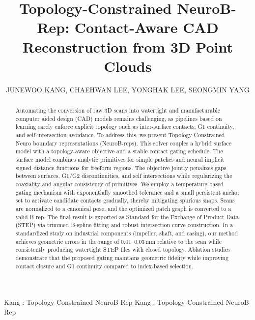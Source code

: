 \documentclass{ieeeaccess}
\begin{document}

\title{Topology-Constrained NeuroB-Rep: Contact-Aware CAD Reconstruction from 3D Point Clouds}

\author{
\uppercase{JuneWoo Kang},
\uppercase{ChaeHwan Lee},
\uppercase{YongHak Lee},
\uppercase{SeongMin Yang}
}

\address[1]{Department of Computer Information Engineering, Kwangwoon University, Seoul 01897, Korea}
\address[2]{Department of Data Science, Konkuk University, Seoul 05029, Korea}
\address[3]{Department of Applied Statistics, Konkuk University, Seoul 05029, Korea}


\markboth
{Kang \headeretal: Topology-Constrained NeuroB-Rep}
{Kang \headeretal: Topology-Constrained NeuroB-Rep}

    
\begin{abstract} 
Automating the conversion of raw 3D scans into watertight and manufacturable computer aided design (CAD) models remains challenging, as pipelines based on learning rarely enforce explicit topology such as inter-surface contacts, G1 continuity, and self-intersection avoidance. To address this, we present Topology-Constrained Neuro boundary representations (NeuroB-reps). This solver couples a hybrid surface model with a topology-aware objective and a stable contact gating schedule. The surface model combines analytic primitives for simple patches and neural implicit signed distance functions for freeform regions. The objective jointly penalizes gaps between surfaces, G1/G2 discontinuities, and self intersections while regularizing the coaxiality and angular consistency of primitives. We employ a temperature-based gating mechanism with exponentially smoothed tolerance and a small persistent anchor set to activate candidate contacts gradually, thereby mitigating spurious snaps. Scans are normalized to a canonical pose, and the optimized patch graph is converted to a valid B-rep. The final result is exported as Standard for the Exchange of Product Data (STEP) via trimmed B-spline fitting and robust intersection curve construction. In a standardized study on industrial components (impeller, shaft, and casing), our method achieves geometric errors in the range of 0.01--0.03\,mm relative to the scan while consistently producing watertight STEP files with closed topology. Ablation studies demonstrate that the proposed gating maintains geometric fidelity while improving contact closure and G1 continuity compared to index-based selection.  
\end{abstract}
\end{document}
